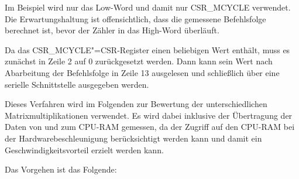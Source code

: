 Im Beispiel wird nur das Low-Word und damit nur CSR\_MCYCLE verwendet. Die Erwartungshaltung ist offensichtlich, dass die gemessene Befehlsfolge berechnet ist, bevor der Zähler in das High-Word überläuft.

Da das CSR\_MCYCLE"=CSR-Register einen beliebigen Wert enthält, muss es zunächst in Zeile 2 auf 0 zurückgesetzt werden. Dann kann sein Wert nach Abarbeitung der Befehlsfolge in Zeile 13 ausgelesen und schließlich über eine serielle Schnittstelle ausgegeben werden.

Dieses Verfahren wird im Folgenden zur Bewertung der unterschiedlichen Matrixmultiplikationen verwendet. Es wird dabei inklusive der Übertragung der Daten von und zum CPU-RAM gemessen, da der Zugriff auf den CPU-RAM bei der Hardwarebeschleunigung berücksichtigt werden kann und damit ein Geschwindigkeitsvorteil erzielt werden kann.

Das Vorgehen ist das Folgende:

